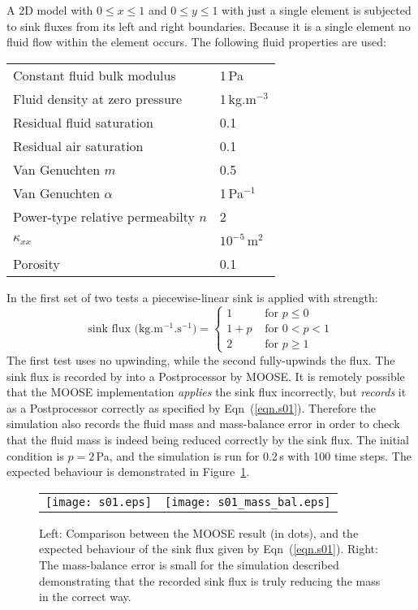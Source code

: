 \documentclass[]{scrreprt}
\begin{document}
A 2D model with $0\leq x \leq 1$ and $0\leq y \leq 1$ with just a
single element is subjected to sink fluxes from its left and right
boundaries.  Because it is a single element no fluid flow within the
element occurs.  The following fluid properties are used:
\begin{center}
\begin{tabular}{|ll|}
\hline
Constant fluid bulk modulus & 1\,Pa \\
Fluid density at zero pressure & 1\,kg.m$^{-3}$ \\
Residual fluid saturation & 0.1 \\
Residual air saturation & 0.1 \\
Van Genuchten $m$ & 0.5 \\
Van Genuchten $\alpha$ & 1\,Pa$^{-1}$ \\
Power-type relative permeabilty $n$ & 2 \\
$\kappa_{xx}$ & $10^{-5}$\,m$^{2}$ \\
Porosity & 0.1 \\
\hline
\end{tabular}
\end{center}

\noindent In the first set of two tests a piecewise-linear sink is applied with strength:
\begin{equation}
\mbox{sink flux (kg.m$^{-1}$.s$^{-1}$)} = \left\{
\begin{array}{ll}
1 & \mbox{ for } p \leq 0 \\
1+p & \mbox{ for } 0<p<1 \\
2 & \mbox{ for } p\geq 1
\end{array}
\right.
\label{eqn.s01}
\end{equation}
The first test uses no upwinding, while the second fully-upwinds the flux.
The sink flux is recorded by into a Postprocessor by MOOSE.  It is
remotely possible that the MOOSE implementation {\em applies} the sink
flux incorrectly, but {\em records} it as a Postprocessor correctly as
specified by Eqn~(\ref{eqn.s01}).  Therefore the simulation also
records the fluid mass and mass-balance error in order to check that
the fluid mass is indeed being reduced correctly by the sink flux.
The initial condition is $p=2$\,Pa, and the simulation is run for
0.2\,s with 100 time steps.  The expected behaviour is demonstrated in
Figure~\ref{s01.fig}.

\begin{figure}[htb]
\centering
\begin{tabular}{cc}
\texttt{[image: s01.eps]} &
\texttt{[image: s01\_mass\_bal.eps]}
\end{tabular}
\caption{Left: Comparison between the MOOSE result (in dots), and the
  expected behaviour of the sink flux given by Eqn~(\ref{eqn.s01}).
  Right: The mass-balance error is small for the simulation described
  demonstrating that the recorded sink flux is truly reducing the mass
  in the correct way.}
\label{s01.fig}
\end{figure}
\end{document}
